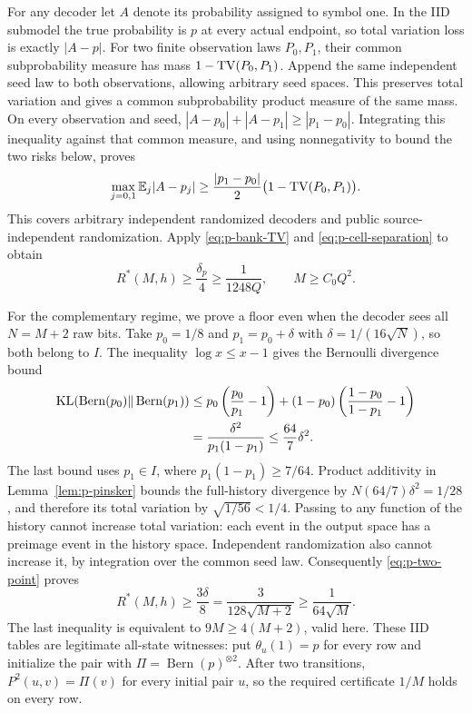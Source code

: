 For any decoder let $A$ denote its probability assigned to symbol one.
In the IID submodel the true probability is $p$ at every actual
endpoint, so total variation loss is exactly $|A-p|$.
For two finite observation laws $P_0,P_1$, their common
subprobability measure has mass $1-\operatorname{TV}(P_0,P_1)$.
Append the same independent seed law to both observations, allowing
arbitrary seed spaces.  This preserves total variation and gives a
common subprobability product measure of the same mass.  On every
observation and seed,
$|A-p_0|+|A-p_1|\ge|p_1-p_0|$.
Integrating this inequality against that common measure, and using
nonnegativity to bound the two risks below, proves
\begin{equation}\label{eq:p-two-point}
 \max_{j=0,1}\mathbb E_j|A-p_j|
 \ge\frac{|p_1-p_0|}{2}\bigl(1-\operatorname{TV}(P_0,P_1)\bigr).
\end{equation}
This covers arbitrary independent randomized decoders and public
source-independent randomization.  Apply \eqref{eq:p-bank-TV} and
\eqref{eq:p-cell-separation} to obtain
\begin{equation}\label{eq:p-large-regime}
 R^*(M,h)\ge\frac{\delta_p}{4}\ge\frac1{1248Q},
 \qquad M\ge C_0Q^2.
\end{equation}

For the complementary regime, we prove a floor even when the decoder
sees all $N=M+2$ raw bits.  Take
$p_0=1/8$ and $p_1=p_0+\delta$ with
$\delta=1/(16\sqrt N)$, so both belong to $I$.
The inequality $\log x\le x-1$ gives the Bernoulli divergence bound
\[
 \begin{split}
 \operatorname{KL}(\operatorname{Bern}(p_0)\Vert\operatorname{Bern}(p_1))
 &\le p_0\left(\frac{p_0}{p_1}-1\right)
 +(1-p_0)\left(\frac{1-p_0}{1-p_1}-1\right)\\
 &=\frac{\delta^2}{p_1(1-p_1)}
 \le\frac{64}{7}\delta^2.
 \end{split}
\]
The last bound uses $p_1\in I$, where $p_1(1-p_1)\ge7/64$.
Product additivity in Lemma~\ref{lem:p-pinsker} bounds the full-history
divergence by $N(64/7)\delta^2=1/28$, and therefore its total variation
by $\sqrt{1/56}<1/4$.  Passing to any function of the history cannot
increase total variation: each event in the output space has a
preimage event in the history space.  Independent randomization also
cannot increase it, by integration over the common seed law.
Consequently \eqref{eq:p-two-point} proves
\begin{equation}\label{eq:p-history-floor}
 R^*(M,h)\ge\frac{3\delta}{8}
 =\frac3{128\sqrt{M+2}}\ge\frac1{64\sqrt M}.
\end{equation}
The last inequality is equivalent to $9M\ge4(M+2)$, valid here.
These IID tables are legitimate all-state witnesses: put
$\theta_u(1)=p$ for every row and initialize the pair with
$\Pi=\operatorname{Bern}(p)^{\otimes2}$.  After two transitions,
$P^2(u,v)=\Pi(v)$ for every initial pair $u$, so the required
certificate $1/M$ holds on every row.

